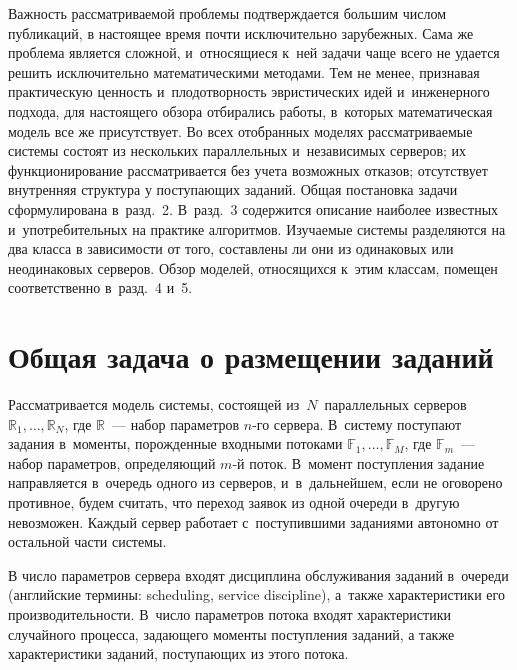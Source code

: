 \begin{multicols}{2}
    Важность рассматриваемой проблемы подтверждается большим числом публикаций, 
в настоящее время почти исключительно зарубежных. Сама же проблема является 
сложной, и~относящиеся к~ней задачи чаще всего не удается решить исключительно 
математическими методами. Тем не менее, признавая практическую ценность 
и~плодотворность эвристических идей и~инженерного подхода, для настоящего обзора 
отбирались работы, в~которых математическая модель все же присутствует. Во всех 
отобранных моделях рассматриваемые системы состоят из нескольких параллельных 
и~независимых серверов; их функционирование рассматривается без учета возможных 
отказов; отсутствует внутренняя структура у поступающих заданий. Общая постановка 
задачи сформулирована в~разд.~2. В~разд.~3 содержится описание наиболее известных 
и~употребительных на практике алгоритмов. Изучаемые системы разделяются на два класса 
в зависимости от того, составлены ли они из одинаковых или не\-оди\-на\-ко\-вых серверов. 
Обзор моделей, относящихся к~этим классам, помещен соответственно в~разд.~4 и~5.

\vspace*{-6pt}

\section{Общая задача о размещении заданий}

\vspace*{-2pt}

    Рассматривается модель системы, состоящей из~$N$~параллельных серверов 
$\mathbb{R}_1,\ldots, \mathbb{R}_N$, где $\mathbb{R}$~--- набор параметров $n$-го сервера. 
В~систему поступают задания в~моменты, порожденные входными потоками 
$\mathbb{F}_1,\ldots, \mathbb{F}_M$, где $\mathbb{F}_m$~--- набор параметров, 
определяющий $m$-й поток. В~момент поступления задание направляется в~очередь 
одного из серверов, и~в~дальнейшем, если не оговорено противное, будем считать, что 
переход заявок из одной очереди в~другую невозможен. Каждый сервер работает 
с~поступившими заданиями автономно от остальной части системы.
    
    В число параметров сервера входят дисциплина обслуживания заданий в~очереди 
(английские термины: scheduling, service discipline), а~также характеристики его 
производительности. В~число параметров потока входят характеристики случайного 
процесса, задающего моменты поступления заданий, а также характеристики заданий, 
поступающих из этого потока.
    

\end{multicols}
